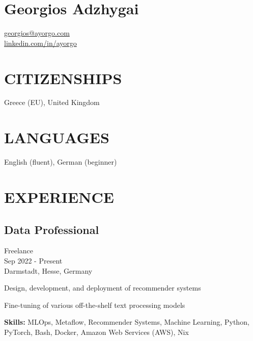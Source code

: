 \documentclass[a4paper,10pt]{article}
\begin{document}
\section*{\Large Georgios Adzhygai}
\href{mailto:georgios@ayorgo.com}{georgios@ayorgo.com} \\
\href{https://www.linkedin.com/in/ayorgo}{linkedin.com/in/ayorgo}

\section*{CITIZENSHIPS}
Greece (EU), United Kingdom

\section*{LANGUAGES}
English (fluent), German (beginner)

\section*{EXPERIENCE}

\subsection*{Data Professional}
Freelance \\
Sep 2022 - Present \\
Darmstadt, Hesse, Germany
\begin{bulletlist}
    \item Design, development, and deployment of recommender systems
    \item Fine-tuning of various off-the-shelf text processing models
\end{bulletlist}
\textbf{Skills:} MLOps, Metaflow, Recommender Systems, Machine Learning, Python, PyTorch, Bash, Docker, Amazon
Web Services (AWS), Nix
\end{document}
